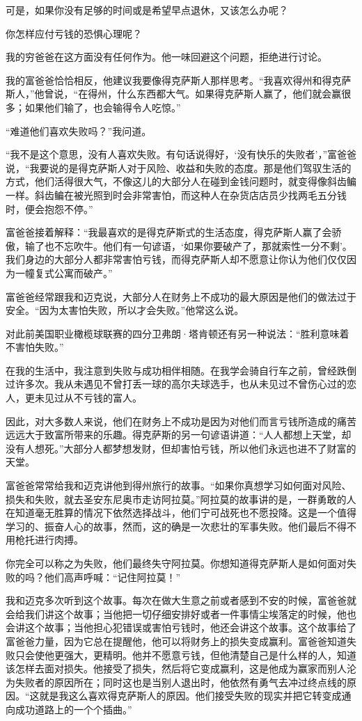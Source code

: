 可是，如果你没有足够的时间或是希望早点退休，又该怎么办呢？

你怎样应付亏钱的恐惧心理呢？

我的穷爸爸在这方面没有任何作为。他一味回避这个问题，拒绝进行讨论。

我的富爸爸恰恰相反，他建议我要像得克萨斯人那样思考。“我喜欢得州和得克萨斯人，”他曾说，“在得州，什么东西都大气。如果得克萨斯人赢了，他们就会赢很多；如果他们输了，也会输得令人吃惊。”

“难道他们喜欢失败吗？”我问道。

“我不是这个意思，没有人喜欢失败。有句话说得好，‘没有快乐的失败者’，”富爸爸说，“我要说的是得克萨斯人对于风险、收益和失败的态度。那是他们驾驭生活的方式，他们活得很大气，不像这儿的大部分人在碰到金钱问题时，就变得像斜齿鳊一样。斜齿鳊在被光照到时会非常害怕，而这种人在杂货店店员少找两毛五分钱时，便会抱怨不停。”

富爸爸接着解释：“我最喜欢的是得克萨斯式的生活态度，得克萨斯人赢了会骄傲，输了也不忘吹牛。他们有一句谚语，‘如果你要破产了，那就索性一分不剩’。我们身边的大部分人都非常害怕亏钱，而得克萨斯人却不愿意让你认为他们仅仅因为一幢复式公寓而破产。”

富爸爸经常跟我和迈克说，大部分人在财务上不成功的最大原因是他们的做法过于安全。“因为太害怕失败，所以才会失败。”他常这么说。

对此前美国职业橄榄球联赛的四分卫弗朗·塔肯顿还有另一种说法：“胜利意味着不害怕失败。”

在我的生活中，我注意到失败与成功相伴相随。在我学会骑自行车之前，曾经跌倒过许多次。我从未遇见不曾打丢一球的高尔夫球选手，也从未见过不曾伤心过的恋人，更未见过从不亏钱的富人。

因此，对大多数人来说，他们在财务上不成功是因为对他们而言亏钱所造成的痛苦远远大于致富所带来的乐趣。得克萨斯的另一句谚语讲道：“人人都想上天堂，却没有人想死。”大部分人都梦想发财，但却害怕亏钱，所以他们永远也进不了财富的天堂。

富爸爸常常给我和迈克讲他到得州旅行的故事。“如果你真想学习如何面对风险、损失和失败，就去圣安东尼奥市走访阿拉莫。”阿拉莫的故事讲的是，一群勇敢的人在知道毫无胜算的情况下依然选择战斗，他们宁可战死也不愿投降。这是一个值得学习的、振奋人心的故事，然而，这的确是一次悲壮的军事失败。他们最后不得不用枪托进行肉搏。

你完全可以称之为失败，他们最终失守阿拉莫。你想知道得克萨斯人是如何面对失败的吗？他们高声呼喊：“记住阿拉莫！”

我和迈克多次听到这个故事。每次在做大生意之前或者感到不安的时候，富爸爸就会给我们讲这个故事；当他把一切仔细安排好或者一件事情尘埃落定的时候，他也会讲这个故事；当他担心犯错误或害怕亏钱时，他还会讲这个故事。这个故事给了富爸爸力量，因为它总在提醒他，他可以将财务上的损失变成赢利。富爸爸知道失败只会使他更强大，更精明。他并不愿意亏钱，但他清楚自己是什么样的人，知道该怎样去面对损失。他接受了损失，然后将它变成赢利，这是他成为赢家而别人沦为失败者的原因所在；同时这也是当别人退出时，他依然有勇气去冲过终点线的原因。“这就是我这么喜欢得克萨斯人的原因。他们接受失败的现实并把它转变成通向成功道路上的一个个插曲。”


